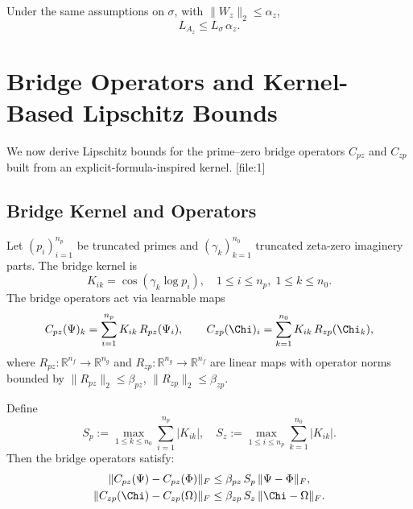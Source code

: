\documentclass[11pt]{article}
\begin{document}
\begin{lemma}
Under the same assumptions on $\sigma$, with $\|W_z\|_2 \le \alpha_z$,
\[
  L_{A_z} \le L_\sigma \, \alpha_z.
\]
\end{lemma}

\section{Bridge Operators and Kernel-Based Lipschitz Bounds}

We now derive Lipschitz bounds for the prime--zero bridge operators
$C_{pz}$ and $C_{zp}$ built from an explicit-formula-inspired kernel.%
[file:1]

\subsection{Bridge Kernel and Operators}

Let $(p_i)_{i=1}^{n_p}$ be truncated primes and
$(\gamma_k)_{k=1}^{n_0}$ truncated zeta-zero imaginery parts. The bridge
kernel is
\[
  K_{ik} = \cos(\gamma_k \log p_i), \quad 1 \le i \le n_p,\; 1 \le k \le n_0.
\]
The bridge operators act via learnable maps
\[
  C_{pz}(\Psi)_k
  = \sum_{i=1}^{n_p} K_{ik} \, R_{pz}(\Psi_i),\qquad
  C_{zp}(\Chi)_i
  = \sum_{k=1}^{n_0} K_{ik} \, R_{zp}(\Chi_k),
\]
where $R_{pz}:\mathbb{R}^{n_f}\to \mathbb{R}^{n_g}$ and
$R_{zp}:\mathbb{R}^{n_g}\to\mathbb{R}^{n_f}$ are linear maps with
operator norms bounded by $\|R_{pz}\|_2 \le \beta_{pz}$,
$\|R_{zp}\|_2 \le \beta_{zp}$.%

\begin{lemma}
Define
\[
  S_p := \max_{1\le k \le n_0} \sum_{i=1}^{n_p} |K_{ik}|, \quad
  S_z := \max_{1\le i \le n_p} \sum_{k=1}^{n_0} |K_{ik}|.
\]
Then the bridge operators satisfy:
\begin{align*}
  \|C_{pz}(\Psi) - C_{pz}(\Phi)\|_F
  &\le \beta_{pz} \, S_p \, \|\Psi - \Phi\|_F,\\
  \|C_{zp}(\Chi) - C_{zp}(\Omega)\|_F
  &\le \beta_{zp} \, S_z \, \|\Chi - \Omega\|_F.
\end{align*}
\end{lemma}
\end{document}
